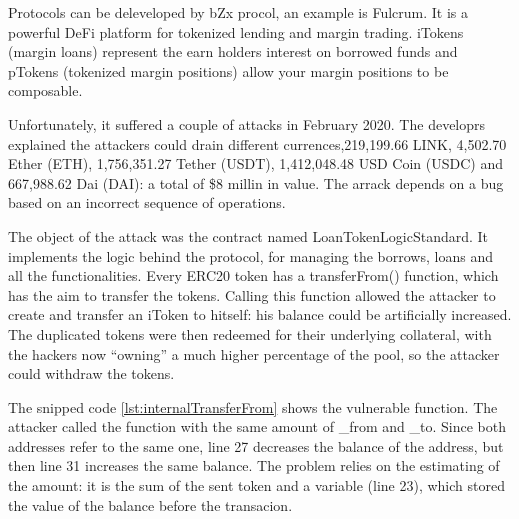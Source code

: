 Protocols can be deleveloped by bZx procol, an example is Fulcrum. 
It is a powerful DeFi platform for tokenized lending and margin trading. 
iTokens (margin loans) represent the earn holders interest on borrowed funds and pTokens (tokenized margin positions) allow your margin positions to be composable.

Unfortunately, it suffered a couple of attacks in February 2020.
The developrs explained the attackers could drain different currences,219,199.66 LINK, 4,502.70 Ether (ETH), 1,756,351.27 Tether (USDT), 
1,412,048.48 USD Coin (USDC) and 667,988.62 Dai (DAI): a total of \$8 millin in value. 
The arrack depends on a bug based on an incorrect sequence of operations.

The object of the attack was the contract named LoanTokenLogicStandard.
It implements the logic behind the protocol, for managing the borrows, loans and all the functionalities.
Every ERC20 token has a transferFrom() function, which has the aim to transfer the tokens.
Calling this function allowed the attacker to create and transfer an iToken to hitself: his balance could be artificially increased.
The duplicated tokens were then redeemed for their underlying collateral, 
with the hackers now “owning” a much higher percentage of the pool, so the attacker could withdraw the tokens.

The snipped code \autoref{lst:internalTransferFrom} shows the vulnerable function. 
The attacker called the function with the same amount of \_from and \_to. 
Since both addresses refer to the same one, line 27 decreases the balance of the address, but then line 31 increases the same balance. 
The problem relies on the estimating of the amount: it is the sum of the sent token and 
a variable (line 23), which stored the value of the balance before the transacion.

